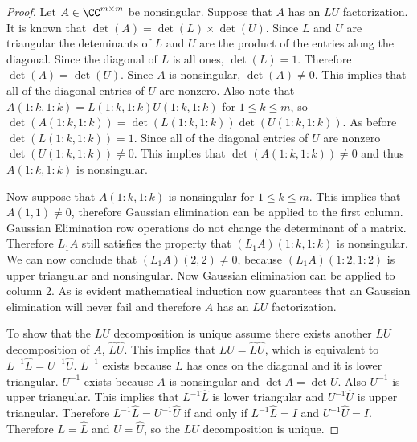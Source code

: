 \documentclass[11pt]{article}
\begin{document}
\begin{enumerate}
        \begin{proof}
            Let $A \in \CC^{m \times m}$ be nonsingular.
            Suppose that $A$ has an $LU$ factorization.
            It is known that $\det(A) = \det(L)\times\det(U)$.
            Since $L$ and $U$ are triangular the deteminants of $L$ and $U$ are
            the product of the entries along the diagonal.
            Since the diagonal of $L$ is all ones, $\det(L) = 1$.
            Therefore $\det(A) = \det(U)$.
            Since $A$ is nonsingular, $\det(A) \neq 0$.
            This implies that all of the diagonal entries of $U$ are nonzero.
            Also note that $A(1:k, 1:k) = L(1:k, 1:k) U(1:k, 1:k)$ for $1 \le k \le m$, so
            $\det(A(1:k, 1:k)) = \det(L(1:k, 1:k)) \det(U(1:k, 1:k))$.
            As before $\det(L(1:k, 1:k)) = 1$.
            Since all of the diagonal entries of $U$ are nonzero
            $\det(U(1:k,1:k)) \neq 0$.
            This implies that $\det(A(1:k, 1:k)) \neq 0$ and thus $A(1:k, 1:k)$
            is nonsingular.

            Now suppose that $A(1:k, 1:k)$ is nonsingular for $1 \le k \le m$.
            This implies that $A(1, 1) \neq 0$, therefore Gaussian elimination
            can be applied to the first column.
            Gaussian Elimination row operations do not change the determinant of
            a matrix.
            Therefore $L_1 A$ still satisfies the property that $(L_1 A)(1:k, 1:k)$ is
            nonsingular.
            We can now conclude that $(L_1 A)(2,2) \neq 0$, because
            $(L_1 A)(1:2, 1:2)$ is upper triangular and nonsingular.
            Now Gaussian elimination can be applied to column 2.
            As is evident mathematical induction now guarantees that an
            Gaussian elimination will never fail and therefore $A$ has an $LU$
            factorization.

            To show that the $LU$ decomposition is unique assume there exists
            another $LU$ decomposition of $A$, $\hat{L}\hat{U}$.
            This implies that $LU = \hat{L}\hat{U}$, which is equivalent to
            $L^{-1}\hat{L} = U^{-1}\hat{U}$.
            $L^{-1}$ exists because $L$ has ones on the diagonal and it is lower
            triangular.
            $U^{-1}$ exists because $A$ is nonsingular and $\det{A} = \det{U}$.
            Also $U^{-1}$ is upper triangular.
            This implies that $L^{-1}\hat{L}$ is lower triangular and
            $U^{-1}\hat{U}$ is upper triangular.
            Therefore $L^{-1}\hat{L} = U^{-1}\hat{U}$ if and only if
            $L^{-1}\hat{L} = I$ and $U^{-1}\hat{U} = I$.
            Therefore $L = \hat{L}$ and $U = \hat{U}$, so the $LU$ decomposition
            is unique.
        \end{proof}


\end{enumerate}
\end{document}
